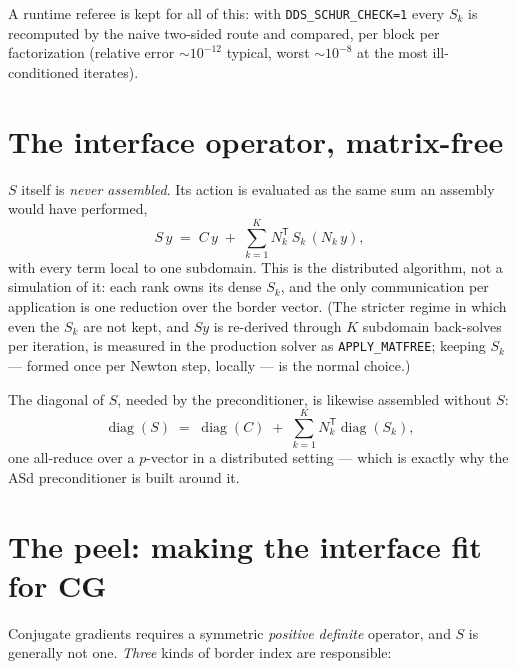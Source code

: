 \documentclass[11pt]{article}
\newcommand{\diag}{\operatorname{diag}}
\newcommand{\code}[1]{\texttt{#1}}
\begin{document}
A runtime referee is kept for all of this: with
\code{DDS\_SCHUR\_CHECK=1} every $S_k$ is recomputed by the naive two-sided
route and compared, per block per factorization (relative error
$\sim\!10^{-12}$ typical, worst $\sim\!10^{-8}$ at the most ill-conditioned
iterates).

\section{The interface operator, matrix-free}
\label{sec:matfree}

$S$ itself is \emph{never assembled}.  Its action is evaluated as the same
sum an assembly would have performed,
\begin{equation}
  S\,y \;=\; C\,y \;+\; \sum_{k=1}^{K} N_k^{\mathsf T}\, S_k\, (N_k\, y),
  \label{eq:applyS}
\end{equation}
with every term local to one subdomain.  This is the distributed algorithm,
not a simulation of it: each rank owns its dense $S_k$, and the only
communication per application is one reduction over the border vector.
(The stricter regime in which even the $S_k$ are not kept, and $S y$ is
re-derived through $K$ subdomain back-solves per iteration, is measured in
the production solver as \code{APPLY\_MATFREE}; keeping $S_k$ --- formed once
per Newton step, locally --- is the normal choice.)

The diagonal of $S$, needed by the preconditioner, is likewise assembled
without $S$:
\begin{equation}
  \diag(S) \;=\; \diag(C) \;+\; \sum_{k=1}^{K} N_k^{\mathsf T}\diag(S_k),
  \label{eq:diagS}
\end{equation}
one all-reduce over a $p$-vector in a distributed setting --- which is
exactly why the ASd preconditioner is built around it.

\section{The peel: making the interface fit for CG}
\label{sec:peel}

Conjugate gradients requires a symmetric \emph{positive definite} operator,
and $S$ is generally not one.  \emph{Three} kinds of border index are
responsible:
\end{document}
